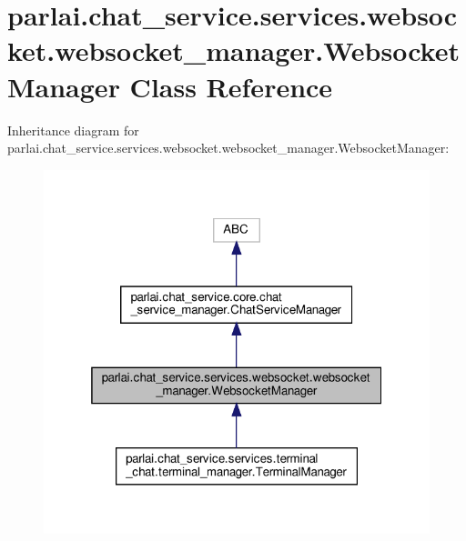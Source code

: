 \hypertarget{classparlai_1_1chat__service_1_1services_1_1websocket_1_1websocket__manager_1_1WebsocketManager}{}\section{parlai.\+chat\+\_\+service.\+services.\+websocket.\+websocket\+\_\+manager.\+Websocket\+Manager Class Reference}
\label{classparlai_1_1chat__service_1_1services_1_1websocket_1_1websocket__manager_1_1WebsocketManager}


Inheritance diagram for parlai.\+chat\+\_\+service.\+services.\+websocket.\+websocket\+\_\+manager.\+Websocket\+Manager\+:
\nopagebreak
\begin{figure}[H]
\begin{center}
\leavevmode
\includegraphics[width=319pt]{d0/d91/classparlai_1_1chat__service_1_1services_1_1websocket_1_1websocket__manager_1_1WebsocketManager__inherit__graph}
\end{center}
\end{figure}


